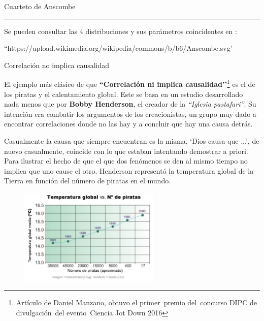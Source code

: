 \begin{myexampleblock}{Cuarteto de Anscombe}
\rule{65mm}{0.1mm}
	
\begin{scriptsize}\textsf{
 Se pueden consultar las 4 distribuciones y sus parámetros coincidentes en :}
 
\vspace{-4mm}\begin{flushright}
	\textsf{``https://upload.wikimedia.org/wikipedia/commons/b/b6/Anscombe.svg'}\end{flushright}
 \end{scriptsize}

\end{myexampleblock}



\vspace{5mm} %
\begin{myexampleblock}{Correlación no implica causalidad}

\begin{small}
El ejemplo más clásico de que \textbf{``Correlación ni implica causalidad’’}\footnote{Artículo de Daniel Manzano, obtuvo el primer premio del concurso DIPC de divulgación del evento Ciencia Jot Down 2016} es el de los piratas y el calentamiento global. Este se basa en un estudio desarrollado nada menos que por \textbf{Bobby Henderson}, el creador de la \emph{``Iglesia pastafari''}. Su intención era combatir los argumentos de los creacionistas, un grupo muy dado a encontrar correlaciones donde no las hay y a concluir que hay una causa detrás. 




\vspace{2mm} Casualmente la causa que siempre encuentran es la misma, `Dios causa que ...', de nuevo casualmente, coincide con lo que estaban intentando demostrar a priori. Para ilustrar el hecho de que el que dos fenómenos se den al mismo tiempo no implica que uno cause el otro. Henderson representó la temperatura global de la Tierra en función del número de piratas en el mundo.

	\begin{figure}[H]
			\centering
			\includegraphics[width=0.6\textwidth]{imagenes/imagenes03/T03IM23.png}
	\end{figure}


\end{small}
\end{myexampleblock}
